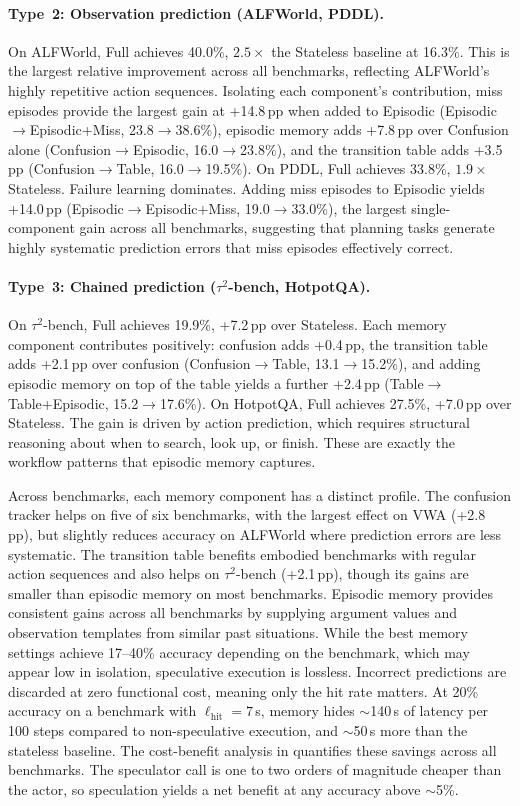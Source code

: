 \documentclass{article}
\begin{document}
\paragraph{Type~2: Observation prediction (ALFWorld, PDDL).}
On ALFWorld, Full achieves 40.0\%, $2.5\times$ the Stateless baseline at 16.3\%. This is the largest relative improvement across all benchmarks, reflecting ALFWorld's highly repetitive action sequences. Isolating each component's contribution, miss episodes provide the largest gain at +14.8\,pp when added to Episodic (Episodic$\to$Episodic+Miss, 23.8$\to$38.6\%), episodic memory adds +7.8\,pp over Confusion alone (Confusion$\to$Episodic, 16.0$\to$23.8\%), and the transition table adds +3.5\,pp (Confusion$\to$Table, 16.0$\to$19.5\%). On PDDL, Full achieves 33.8\%, $1.9\times$ Stateless. Failure learning dominates. Adding miss episodes to Episodic yields +14.0\,pp (Episodic$\to$Episodic+Miss, 19.0$\to$33.0\%), the largest single-component gain across all benchmarks, suggesting that planning tasks generate highly systematic prediction errors that miss episodes effectively correct.

\paragraph{Type~3: Chained prediction ($\tau^{2}$-bench, HotpotQA).}
On $\tau^{2}$-bench, Full achieves 19.9\%, +7.2\,pp over Stateless. Each memory component contributes positively: confusion adds +0.4\,pp, the transition table adds +2.1\,pp over confusion (Confusion$\to$Table, 13.1$\to$15.2\%), and adding episodic memory on top of the table yields a further +2.4\,pp (Table$\to$Table+Episodic, 15.2$\to$17.6\%). On HotpotQA, Full achieves 27.5\%, +7.0\,pp over Stateless. The gain is driven by action prediction, which requires structural reasoning about when to search, look up, or finish. These are exactly the workflow patterns that episodic memory captures.

Across benchmarks, each memory component has a distinct profile. The confusion tracker helps on five of six benchmarks, with the largest effect on VWA (+2.8\,pp), but slightly reduces accuracy on ALFWorld where prediction errors are less systematic. The transition table benefits embodied benchmarks with regular action sequences and also helps on $\tau^{2}$-bench (+2.1\,pp), though its gains are smaller than episodic memory on most benchmarks. Episodic memory provides consistent gains across all benchmarks by supplying argument values and observation templates from similar past situations. While the best memory settings achieve 17--40\% accuracy depending on the benchmark, which may appear low in isolation, speculative execution is lossless. Incorrect predictions are discarded at zero functional cost, meaning only the hit rate matters. At 20\% accuracy on a benchmark with $\ell_{\text{hit}} = 7$\,s, memory hides $\sim$140\,s of latency per 100 steps compared to non-speculative execution, and $\sim$50\,s more than the stateless baseline. The cost-benefit analysis in  quantifies these savings across all benchmarks. The speculator call is one to two orders of magnitude cheaper than the actor, so speculation yields a net benefit at any accuracy above $\sim$5\%.
\end{document}
